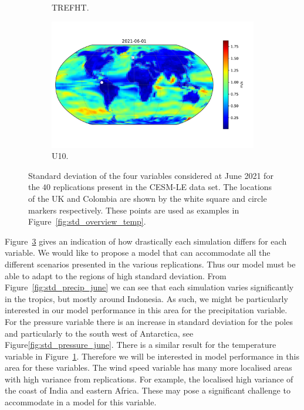 \begin{figure}[htbp!]
\begin{subfigure}[b]{0.45\textwidth}
		\caption{TREFHT.}
		\label{fig:std_temp_june}   
	\end{subfigure}             
	\begin{subfigure}[b]{0.45\textwidth}
		\includegraphics[width=\textwidth]{U10_std}
		\caption{U10.}
		\label{fig:std_wind_june}
	\end{subfigure}             
	\caption[Spatial overview of variability of Precipitation, Pressure, Temperature, and Wind speed.]{ Standard deviation of the four variables considered at June 2021 for the $40$ replications present in the CESM-LE data set. The locations of the UK and Colombia are shown by the white square and circle markers respectively. These points are used as examples in Figure~\ref{fig:std_overview_temp}. }
	\label{fig:std_overview}
\end{figure}

Figure~\ref{fig:std_overview} gives an indication of how drastically each simulation differs for each variable.
We would like to propose a model that can accommodate all the different scenarios presented in the various replications. 
Thus our model must be able to adapt to the regions of high standard deviation. 
From Figure~\ref{fig:std_precip_june} we can see that each simulation varies significantly in the tropics, but mostly around Indonesia.
As such, we might be particularly interested in our model performance in this area for the precipitation variable.
For the pressure variable there is an increase in standard deviation for the poles and particularly to the south west of Antarctica, see Figure\ref{fig:std_pressure_june}.
There is a similar result for the temperature variable in Figure~\ref{fig:std_temp_june}.
Therefore we will be interested in model performance in this area for these variables.
The wind speed variable has many more localised areas with high variance from replications.
For example, the localised high variance of the coast of India and eastern Africa.  
These may pose a significant challenge to accommodate in a model for this variable.

